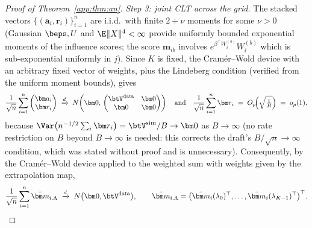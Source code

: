 \begin{proof}[Proof of Theorem~\ref{app:thm:an}]
\emph{Step 3: joint CLT across the grid.} The stacked vectors
$\{(\bm a_i,\bm r_i)\}_{i=1}^n$ are i.i.d.\ with finite $2+\nu$ moments
for some $\nu>0$ (Gaussian $\beps,U$ and $\E\|X\|^4<\infty$ provide
uniformly bounded exponential moments of the influence scores; the score
$\bm m_{ib}$ involves $e^{\beta^\top W_i^{(b)}}W_i^{(b)}$ which is
sub-exponential uniformly in $j$). Since $K$ is fixed, the Cram\'er--Wold
device with an arbitrary fixed vector of weights, plus the Lindeberg
condition (verified from the uniform moment bounds), gives
\[
  \frac{1}{\sqrt n}\sum_{i=1}^n
  \begin{pmatrix}\bm a_i\\ \bm r_i\end{pmatrix}
  \;\xrightarrow{d}\;
  N\!\left(\bm 0,\,
  \begin{pmatrix}\btV^{\mathrm{data}} & \bm 0\\ \bm 0 & \bm 0\end{pmatrix}
  \right)
  \quad\text{and}\quad
  \frac{1}{\sqrt n}\sum_{i=1}^n\bm r_i
  \;=\;O_p\!\Bigl(\sqrt{\tfrac1B}\Bigr)\;=\;o_p(1),
\]
because $\Var\bigl(n^{-1/2}\sum_i\bm r_i\bigr)=\btV^{\mathrm{sim}}/B\to
\bm 0$ as $B\to\infty$ (no rate restriction on $B$ beyond
$B\to\infty$ is needed: this corrects the draft's $B/\sqrt n\to\infty$
condition, which was stated without proof and is unnecessary).
Consequently, by the Cram\'er--Wold device applied to the weighted sum
with weights given by the extrapolation map,
\[
  \frac{1}{\sqrt n}\sum_{i=1}^n\bar{\bm m}_{i,\Lambda}
  \;\xrightarrow{d}\;N\bigl(\bm 0,\btV^{\mathrm{data}}\bigr),
  \qquad
  \bar{\bm m}_{i,\Lambda}=\bigl(\bar{\bm m}_i(\lambda_0)^\top,\dots,
  \bar{\bm m}_i(\lambda_{K-1})^\top\bigr)^\top .
\]


\end{proof}
